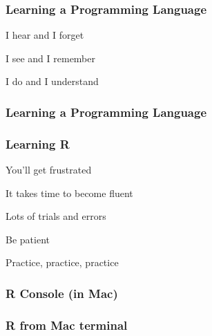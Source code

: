 \documentclass[12pt]{beamer}\usepackage[]{graphicx}\usepackage[]{color}
\begin{document}

\begin{frame}
\frametitle{Learning a Programming Language}

\bbi
  \item I hear and I forget
  \item I see and I remember
  \item I do and I understand
\ei
\eb

\end{frame}


\begin{frame}
\frametitle{Learning a Programming Language}
\begin{center}
\end{center}
\end{frame}


\begin{frame}
\frametitle{Learning R}

\bi
  \item You'll get frustrated
  \item It takes time to become fluent
  \item Lots of trials and errors
  \item Be patient
  \item Practice, practice, practice
\ei
\eb

\end{frame}


\begin{frame}
\frametitle{R Console (in Mac)}

\begin{center}
\end{center}

\end{frame}


\begin{frame}
\frametitle{R from Mac terminal}

\begin{center}
\end{center}

\end{frame}
\end{document}
